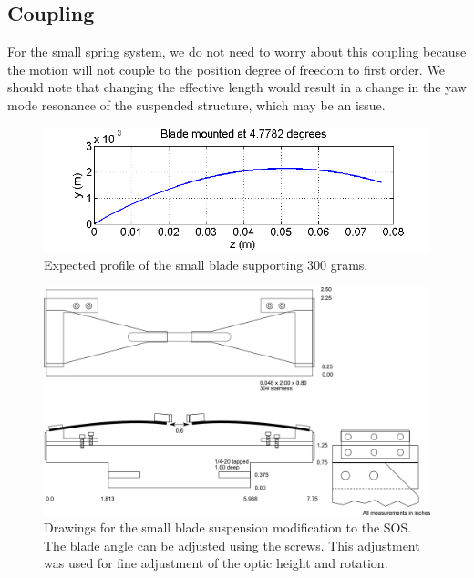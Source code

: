 \subsection{Coupling}
For the small spring system, we do not need to worry about this coupling because the motion will not couple to the position degree of freedom to first order.  We should note that changing the effective length would result in a change in the yaw mode resonance of the suspended structure, which may be an issue. 



\begin{figure}[hp]
	\centering
		\includegraphics[width=.9\textwidth]{figures/suspensions/babybladeprofile.png}
	\caption[Blade profile for small suspension.]{Expected profile of the small blade supporting 300 grams.}
	\label{fig:babybladeprofile}
\end{figure}





\begin{figure}[p]
	\centering
		\includegraphics[width=\textwidth, angle=90]{figures/suspensions/bb1.png}
	\caption[Small blade design]{Drawings for the small blade suspension modification to the SOS. The blade angle can be adjusted using the screws. This adjustment was used for fine adjustment of the optic height and rotation.}
	\label{fig:babyschematic}
\end{figure}
